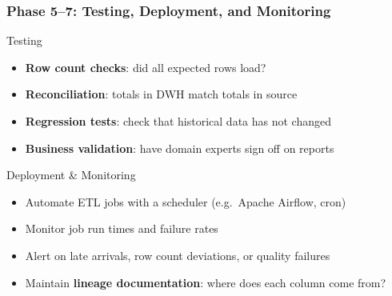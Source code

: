 \begin{frame}
  \frametitle{Phase 5--7: Testing, Deployment, and Monitoring}

  \begin{block}{Testing}
    \begin{itemize}
      \item \textbf{Row count checks}: did all expected rows load?
      \item \textbf{Reconciliation}: totals in DWH match totals in source
      \item \textbf{Regression tests}: check that historical data has not changed
      \item \textbf{Business validation}: have domain experts sign off on reports
    \end{itemize}
  \end{block}

  \begin{block}{Deployment \& Monitoring}
    \begin{itemize}
      \item Automate ETL jobs with a scheduler (e.g.\ Apache Airflow, cron)
      \item Monitor job run times and failure rates
      \item Alert on late arrivals, row count deviations, or quality failures
      \item Maintain \textbf{lineage documentation}: where does each column come from?
    \end{itemize}
  \end{block}

\end{frame}

